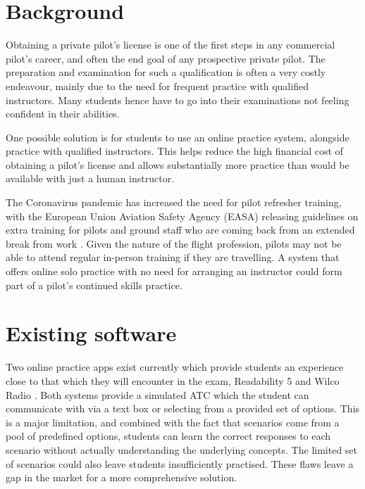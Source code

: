 \section{Background}
Obtaining a private pilot's license is one of the first steps in any commercial pilot's career, and often the end goal of any prospective private pilot.
The preparation and examination for such a qualification is often a very costly endeavour, mainly due to the need for frequent practice with qualified instructors.
Many students hence have to go into their examinations not feeling confident in their abilities.

One possible solution is for students to use an online practice system, alongside practice with qualified instructors. This helps reduce the high financial cost of obtaining a pilot's license and allows substantially more practice than would be available with just a human instructor.

The Coronavirus pandemic has increased the need for pilot refresher training, with the European Union Aviation Safety Agency (EASA) releasing guidelines on extra training for pilots and ground staff who are coming back from an extended break from work \cite{EASA-Training-Post-Covid}. Given the nature of the flight profession, pilots may not be able to attend regular in-person training if they are travelling. A system that offers online solo practice with no need for arranging an instructor could form part of a pilot's continued skills practice.

\newpage
\section{Existing software}
Two online practice apps exist currently which provide students an experience close to that which they will encounter in the exam, Readability 5 \cite{Readability5} and Wilco Radio \cite{Wilco-Radio}.
Both systems provide a simulated ATC which the student can communicate with via a text box or selecting from a provided set of options. This is a major limitation, and combined with the fact that scenarios come from a pool of predefined options, students can learn the correct responses to each scenario without actually understanding the underlying concepts. The limited set of scenarios could also leave students insufficiently practised. These flaws leave a gap in the market for a more comprehensive solution.